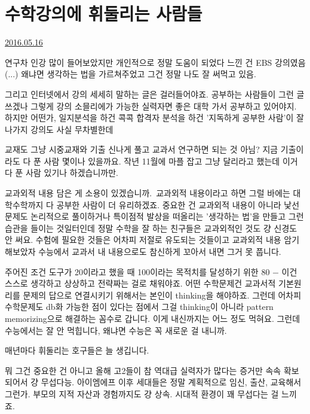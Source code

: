 \section{수학강의에 휘둘리는 사람들}
\href{https://www.kockoc.com/Apoc/775832}{2016.05.16}

\vspace{5mm}

연구차 인강 많이 들어보았지만
개인적으로 정말 도움이 되었다 느낀 건 EBS 강의였음(...)
왜냐면 생각하는 법을 가르쳐주었고 그건 정말 나도 잘 써먹고 있음.
\vspace{5mm}

그리고 인터넷에서 강의 세세히 말하는 글은 걸러들어야죠. 공부하는 사람들이 그런 글 쓰겠나
그렇게 강의 소믈리에가 가능한 실력자면 좋은 대학 가서 공부하고 있어야지.
하지만 어떤가, 일지분석을 하건 콕콕 합격자 분석을 하건 '지독하게 공부한 사람'이 잘 나가지 강의도 사실 무차별한데
\vspace{5mm}

교재도 그냥 시중교재와 기출 신나게 풀고 교과서 연구하면 되는 것 아님?
지금 기출이라도 다 푼 사람 몇이나 있을까요.
작년 11월에 마플 잡고 그냥 달리라고 했는데 이거 다 푼 사람 있기나 하겠습니까만.
\vspace{5mm}

교과외적 내용 담은 게 소용이 있겠습니까. 교과외적 내용이라고 하면 그럴 바에는 대학수학까지 다 공부한 사람이 더 유리하겠죠.
중요한 건 교과외적 내용이 아니라 낯선 문제도 논리적으로 풀이하거나
특이점적 발상을 떠올리는 '생각하는 법'을 만들고 그런 습관을 들이는 것일터인데
정말 수학을 잘 하는 친구들은 교과외적인 것도 걍 신경도 안 써요. 수험에 필요한 것들은 어차피 저절로 유도되는 것들이고
교과외적 내용 암기해보았자 수능에서 교과서 내 내용으로도 참신하게 꼬아서 내면 그거 못 풉니다.
\vspace{5mm}

주어진 조건 도구가 20이라고 했을 때 100이라는 목적치를 달성하기 위한 80 $-$ 이건 스스로 생각하고 상상하고 전략짜는 걸로 채워야죠.
어떤 수학문제건 교과서적 기본원리를 문제의 답으로 연결시키기 위해서는 본인이 thinking을 해야하죠.
그런데 어차피 수학문제도 db화 가능한 점이 있다는 점에서 그걸 thinking이 아니라 pattern memorizing으로 해결하는 꼼수로 갑니다.
이게 내신까지는 어느 정도 먹혀요. 그런데 수능에서는 잘 안 먹힙니다, 왜냐면 수능은 꼭 새로운 걸 내니까.
\vspace{5mm}

매년마다 휘둘리는 호구들은 늘 생깁니다.
\vspace{5mm}

뭐 그건 중요한 건 아니고 올해 고2들이 참 역대급 실력자가 많다는 증거만 속속 확보되어서 걍 무섭다능.
아이엠에프 이후 세대들은 정말 계획적으로 임신, 출산, 교육해서 그런가. 부모의 지적 자산과 경험까지도 걍 상속.
시대적 환경이 꽤 무섭다는 걸 느끼죠.
\vspace{5mm}









